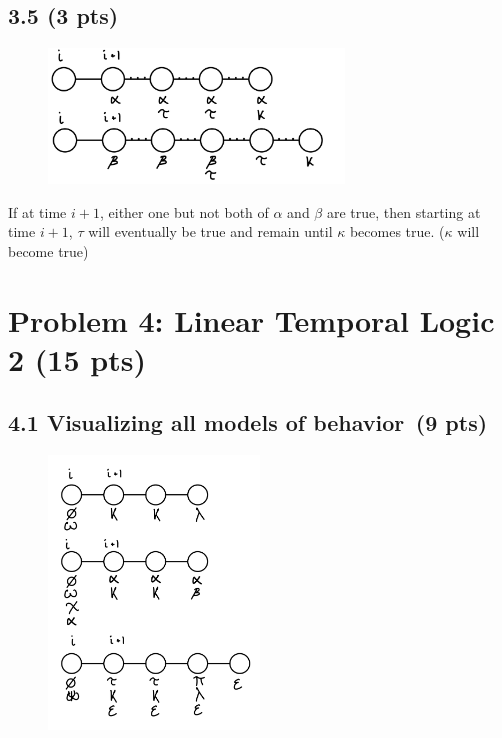 \documentclass[12pt]{article}
\begin{document}
\subsection*{3.5 (3 pts)}
\begin{figure}[h]
    \centering
    \includegraphics[width=0.7\textwidth]{images/3.5.png}
\end{figure}
If at time $i+1$, either one but not both of $\alpha$ and $\beta$ are true, then starting at time $i+1$, $\tau$ will eventually be true and remain until $\kappa$ becomes true. ($\kappa$ will become true)

\newpage
\section*{Problem 4: Linear Temporal Logic 2 (15 pts)}

\subsection*{4.1 Visualizing all models of behavior \,(9 pts)}
\begin{figure}[h]
    \centering
    \includegraphics[width=0.5\textwidth]{images/4.1}
\end{figure}
\end{document}
